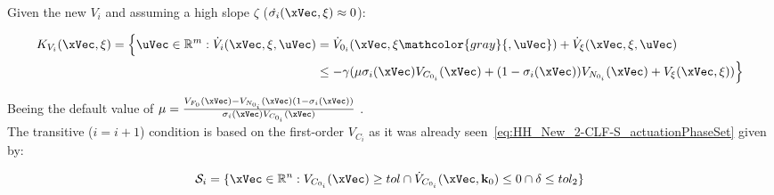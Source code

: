 Given the new  \(V_{i}\) and assuming a high slope \(\zeta\) (\(\dot{\sigma_i}(\xVec, \xi)\approx 0\)):

\begin{align}
    K_{V_{i}}(\xVec, \xi) = \Bigl\{\uVec \in \mathbb{R}^m: \dot{V}_{i}(\xVec, \xi,  \uVec) &= \dot{V}_{0_i}(\xVec, \xi \mathcolor{gray}{, \uVec}) + \dot{V}_{\xi}(\xVec, \xi, \uVec) \notag \\
    &\leq -\gamma( \mu \sigma_i(\xVec) V_{C_{0_i}}(\xVec) + (1 - \sigma_i(\xVec))V_{N_{0_i}}(\xVec) + V_{\xi}(\xVec, \xi))\Bigr\}
    \label{eq:HH_2-CLF-S_Constraint_multiple_waypoints}
\end{align}

Beeing the default value of \(\mu =\frac{V_{F_{0}}(\xVec)- V_{N_{0_i}}(\xVec)(1 -\sigma_i(\xVec))}{\sigma_i(\xVec) V_{C_{0_i}}(\xVec)} \) .\\


The transitive (\(i = i+1\)) condition is based on the first-order  \(V_{C_i}\) as it was already seen~\eqref{eq:HH_New_2-CLF-S_actuationPhaseSet} given by:

\begin{equation}
    \mathcal{S}_i = \{\xVec \in \mathbb{R}^n: V_{C_{0_i}}(\xVec) \geq tol \cap \dot{V}_{C_{0_i}}(\xVec, \mathbf{k}_0) \leq 0 \cap \delta \leq tol_2 \}
    \label{eq:HH_New_2-CLF-S_actuationPhaseSet}
\end{equation}\\



